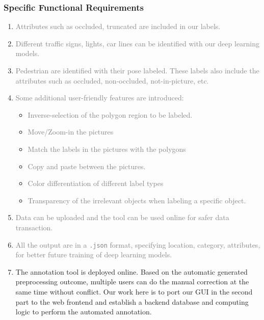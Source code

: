 \subsubsection{Specific Functional Requirements}
\begin{enumerate}
    \item \textcolor{gray}{Attributes such as occluded, truncated are included in our labels. }
    \item \textcolor{gray}{Different traffic signs, lights, car lines can be identified with our deep learning models.}
    \item \textcolor{gray}{Pedestrian are identified with their pose labeled. These labels also include the attributes such as occluded, non-occluded, not-in-picture, etc.}
    \item \textcolor{gray}{Some additional user-friendly features are introduced:} \begin{itemize}
        \item \textcolor{gray}{Inverse-selection of the polygon region to be labeled.}
        \item \textcolor{gray}{Move/Zoom-in the pictures}
        \item \textcolor{gray}{Match the labels in the pictures with the polygons}
        \item \textcolor{gray}{Copy and paste between the pictures.}
        \item \textcolor{gray}{Color differentiation of different label types}
        \item \textcolor{gray}{Transparency of the irrelevant objects when labeling a specific object. }
    \end{itemize}  
    \item \textcolor{gray}{Data can be uploaded and the tool can be used online for safer data transaction.}
    \item \textcolor{gray}{All the output are in a \texttt{.json} format, specifying location, category, attributes, for better future training of deep learning models.}
    
    \item The annotation tool is deployed online. Based on the automatic generated preprocessing outcome, multiple users can do the manual correction at the same time without conflict. Our work here is to port our GUI in the second part to the web frontend and establish a backend database and computing logic to perform the automated annotation.
\end{enumerate}



